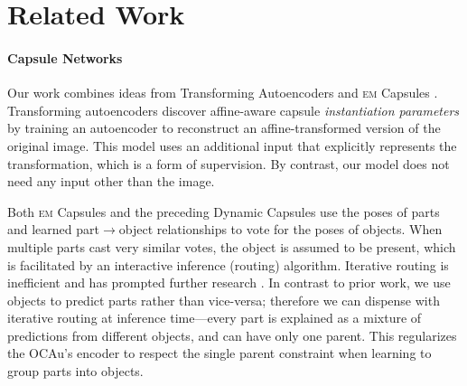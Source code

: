 \section{Related Work}
\label{sec:sca_related_work}

\paragraph{Capsule Networks}
Our work combines ideas from Transforming Autoencoders \citep{Hinton2011tae} and \textsc{em} Capsules \citep{Hinton2018capsule}.
Transforming autoencoders discover affine-aware capsule \textit{instantiation parameters} by training an autoencoder to reconstruct an affine-transformed version of the original image.
This model uses an additional input that explicitly represents the transformation, which is a form of supervision.
By contrast, our model does not need any input other than the image.

Both \textsc{em} Capsules and the preceding Dynamic Capsules \citep{Sabour2017capsule} use the poses of parts and learned part$\rightarrow$object relationships to vote for the poses of objects. When multiple parts cast very similar votes, the object is assumed to be present, which is facilitated by an interactive inference (routing) algorithm. 
Iterative routing is inefficient and has prompted further research \citep{Wang2018optimization,Zhang2018fast,Li2018encapsule}.
In contrast to prior work, we use objects to predict parts rather than vice-versa; therefore we can dispense with iterative routing at inference time---every part is explained as a mixture of predictions from different objects, and can have only one parent.
This regularizes the \gls{OCAu}'s encoder to respect the single parent constraint when learning to group parts into objects.

